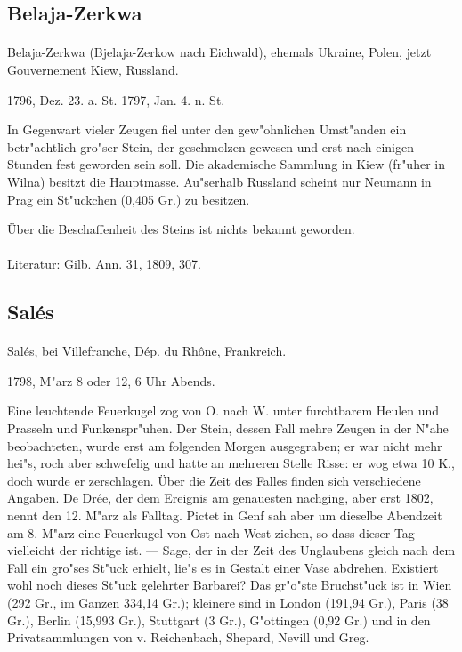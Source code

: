 \documentclass[a4paper, 11pt, oneside]{article}
\begin{document}
\subsection{Belaja-Zerkwa}
\normalsize
\paragraph{}
Belaja-Zerkwa (Bjelaja-Zerkow nach Eichwald), ehemals Ukraine, Polen, jetzt Gouvernement Kiew, Russland.

1796, Dez. 23. a. St. 1797, Jan. 4. n. St.

In Gegenwart vieler Zeugen fiel unter den gew"ohnlichen Umst"anden ein betr"achtlich gro"ser Stein, der geschmolzen gewesen und erst nach einigen Stunden fest geworden sein soll. Die akademische Sammlung in Kiew (fr"uher in Wilna) besitzt die Hauptmasse. Au"serhalb Russland scheint nur Neumann in Prag ein St"uckchen (0,405 Gr.) zu besitzen.

Über die Beschaffenheit des Steins ist nichts bekannt geworden.

\footnotesize
\paragraph{}
Literatur: Gilb. Ann. 31, 1809, 307.
\subsection{Salés}
\normalsize
\paragraph{}
Salés, bei Villefranche, Dép. du Rhône, Frankreich.

1798, M"arz 8 oder 12, 6 Uhr Abends.

Eine leuchtende Feuerkugel zog von O. nach W. unter furchtbarem Heulen und Prasseln und Funkenspr"uhen. Der Stein, dessen Fall mehre Zeugen in der N"ahe beobachteten, wurde erst am folgenden Morgen ausgegraben; er war nicht mehr hei"s, roch aber schwefelig und hatte an mehreren Stelle Risse: er wog etwa 10 K., doch wurde er zerschlagen. Über die Zeit des Falles finden sich verschiedene Angaben. De Drée, der dem Ereignis am genauesten nachging, aber erst 1802, nennt den 12. M"arz als Falltag. Pictet in Genf sah aber um dieselbe Abendzeit am 8. M"arz eine Feuerkugel von Ost nach West ziehen, so dass dieser Tag vielleicht der richtige ist. --- Sage, der in der Zeit des Unglaubens gleich nach dem Fall ein gro"ses St"uck erhielt, lie"s es in Gestalt einer Vase abdrehen. Existiert wohl noch dieses St"uck gelehrter Barbarei? Das gr"o"ste Bruchst"uck ist in Wien (292 Gr., im Ganzen 334,14 Gr.); kleinere sind in London (191,94 Gr.), Paris (38 Gr.), Berlin (15,993 Gr.), Stuttgart (3 Gr.), G"ottingen (0,92 Gr.) und in den Privatsammlungen von v. Reichenbach, Shepard, Nevill und Greg.
\end{document}
